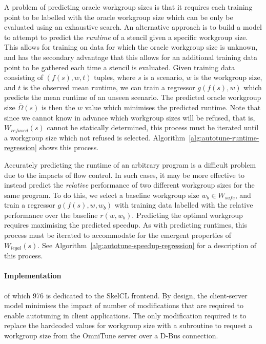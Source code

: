 \documentclass[nonatbib,preprint,9pt]{sigplanconf}
\begin{document}
A problem of predicting oracle workgroup sizes is that it requires
each training point to be labelled with the oracle workgroup size
which can be only be evaluated using an exhaustive search. An
alternative approach is to build a model to attempt to predict the
\emph{runtime} of a stencil given a specific workgroup size. This
allows for training on data for which the oracle workgroup size is
unknown, and has the secondary advantage that this allows for an
additional training data point to be gathered each time a stencil is
evaluated. Given training data consisting of $(f(s),w,t)$ tuples,
where $s$ is a scenario, $w$ is the workgroup size, and $t$ is the
observed mean runtime, we can train a regressor $g(f(s), w)$ which
predicts the mean runtime of an unseen scenario. The predicted oracle
workgroup size $\bar{\Omega}(s)$ is then the $w$ value which minimises
the predicted runtime. Note that since we cannot know in advance
which workgroup sizes will be refused, that is, $W_{refused}(s)$
cannot be statically determined, this process must be iterated until a
workgroup size which not refused is
selected. Algorithm~\ref{alg:autotune-runtime-regression} shows this
process.

Accurately predicting the runtime of an arbitrary program is a
difficult problem due to the impacts of flow control. In such cases,
it may be more effective to instead predict the \emph{relative}
performance of two different workgroup sizes for the same program. To
do this, we select a baseline workgroup size $w_b \in W_{safe}$, and
train a regressor $g(f(s),w,w_b)$ with training data labelled with the
relative performance over the baseline $r(w, w_b)$. Predicting the
optimal workgroup requires maximising the predicted speedup.  As with
predicting runtimes, this process must be iterated to accommodate for
the emergent properties of $W_{legal}(s)$. See
Algorithm~\ref{alg:autotune-speedup-regression} for a description of
this process.

\paragraph{Implementation}

of which 976 is dedicated to the SkelCL frontend. By design, the
client-server model minimises the impact of number of modifications
that are required to enable autotuning in client applications. The
only modification required is to replace the hardcoded values for
workgroup size with a subroutine to request a workgroup size from the
OmniTune server over a D-Bus connection.
\end{document}
